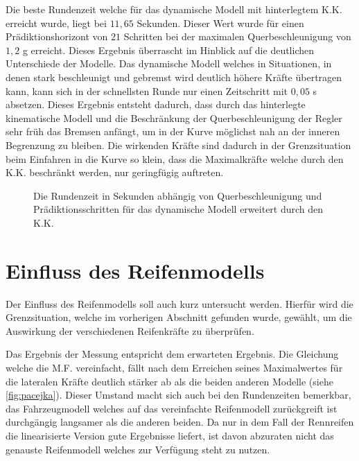 \documentclass{like}
\begin{document}
Die beste Rundenzeit welche für das dynamische Modell mit hinterlegtem \ac{K.K.} erreicht wurde, liegt bei $11,65$ Sekunden. Dieser Wert wurde für einen Prädiktionshorizont von $21$ Schritten bei der maximalen Querbeschleunigung von $1,2$ g erreicht. Dieses Ergebnis überrascht im Hinblick auf die deutlichen Unterschiede der Modelle. Das dynamische Modell welches in Situationen, in denen stark beschleunigt und gebremst wird deutlich höhere Kräfte übertragen kann, kann sich in der schnellsten Runde nur einen Zeitschritt mit $0,05$ s absetzen. Dieses Ergebnis entsteht dadurch, dass durch das hinterlegte kinematische Modell und die Beschränkung der Querbeschleunigung der Regler sehr früh das Bremsen anfängt, um in der Kurve möglichst nah an der inneren Begrenzung zu bleiben. Die wirkenden Kräfte sind dadurch in der Grenzsituation beim Einfahren in die Kurve so klein, dass die Maximalkräfte welche durch den \ac{K.K.} beschränkt werden, nur geringfügig auftreten.
\begin{figure}
	\centering
	 
	\caption{Die Rundenzeit in Sekunden abhängig von Querbeschleunigung und Prädiktionsschritten für das dynamische Modell erweitert durch den \ac{K.K.}}
	\label{fig:betaMaxFineKam}
\end{figure}

\section{Einfluss des Reifenmodells}
Der Einfluss des Reifenmodells soll auch kurz untersucht werden. Hierfür wird die Grenzsituation, welche im vorherigen Abschnitt gefunden wurde, gewählt, um die Auswirkung der verschiedenen Reifenkräfte zu überprüfen.


\begin{figure}
	\centering
	 
	\caption{}
	\label{fig:tireModelDiff}
\end{figure}

Das Ergebnis der Messung entspricht dem erwarteten Ergebnis. Die Gleichung welche die \ac{M.F.} vereinfacht, fällt nach dem Erreichen seines Maximalwertes für die lateralen Kräfte deutlich stärker ab als die beiden anderen Modelle (siehe \ref{fig:pacejka}). Dieser Umstand macht sich auch bei den Rundenzeiten bemerkbar, das Fahrzeugmodell welches auf das vereinfachte Reifenmodell zurückgreift ist durchgängig langsamer als die anderen beiden. Da nur in dem Fall der Rennreifen die linearisierte Version gute Ergebnisse liefert, ist davon abzuraten nicht das genauste Reifenmodell welches zur Verfügung steht zu nutzen.    
\end{document}
